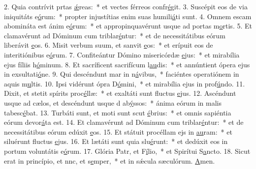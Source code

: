 2. Quia contrívit prtas \uline{ǽ}reas:~* et vectes férreos confr\uline{é}git.
3. Suscépit eos de via iniquitáts e\uline{ó}rum:~* propter injustítias enim suas humili\uline{á}ti sunt.
4. Omnem escam abomináta est ánim e\uline{ó}rum:~* et appropinquavérunt usque ad portas m\uline{o}rtis.
5. Et clamavérunt ad Dóminum cum triblar\uline{é}ntur:~* et de necessitátibus eórum liberávit \uline{e}os.
6. Misit verbum suum, et sanvit \uline{e}os:~* et erípuit eos de interitiónibus e\uline{ó}rum.
7. Confiteántur Dómino misericórdæ \uline{e}jus:~* et mirabília ejus fíliis h\uline{ó}minum.
8. Et sacríficent sacrifícum l\uline{au}dis:~* et annúntient ópera ejus in exsultati\uline{ó}ne.
9. Qui descéndunt mar in n\uline{á}vibus,~* faciéntes operatiónem in aquis m\uline{u}ltis.
10. Ipsi vidérunt ópra D\uline{ó}mini,~* et mirabília ejus in prof\uline{ú}ndo.
11. Dixit, et stetit spírits proc\uline{é}llæ:~* et exaltáti sunt fluctus \uline{e}jus.
12. Ascéndunt usque ad cælos, et descéndunt usque d ab\uline{ý}ssos:~* ánima eórum in malis tabesc\uline{é}bat.
13. Turbáti sunt, et moti sunt scut \uline{é}brius:~* et omnis sapiéntia eórum devor\uline{á}ta est.
14. Et clamavérunt ad Dóminum cum triblar\uline{é}ntur:~* et de necessitátibus eórum edúxit \uline{e}os.
15. Et státuit procéllam ejs in \uline{au}ram:~* et siluérunt fluctus \uline{e}jus.
16. Et lætáti sunt quia slu\uline{é}runt:~* et dedúxit eos in portum voluntátis e\uline{ó}rum.
17. Glória Patr, et F\uline{í}lio,~* et Spirítui S\uline{a}ncto.
18. Sicut erat in princípio, et nnc, et s\uline{e}mper,~* et in sǽcula sæculórum. \uline{A}men.
